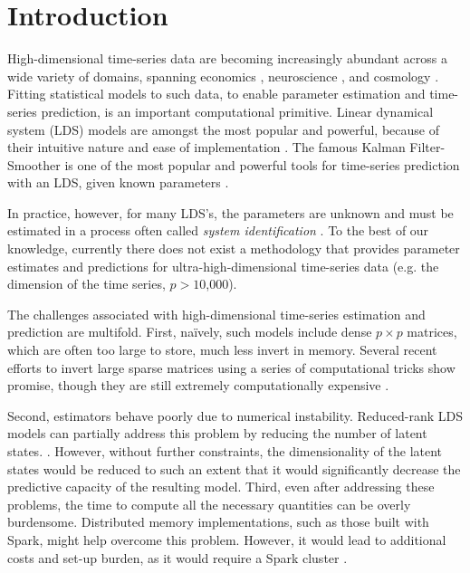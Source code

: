 \documentclass[times,twocolumn,final,authoryear]{elsarticle}
\begin{document}

\section{Introduction}
High-dimensional  time-series data are becoming increasingly  abundant across a wide variety of domains, spanning economics \citep{Johansen1988}, neuroscience \citep{Friston2003a},   and cosmology \citep{Xie2013a}. Fitting statistical models to such data, to enable parameter estimation and time-series prediction, is an important computational primitive.
Linear dynamical system (LDS) models are amongst the most popular and powerful, because of their intuitive nature and ease of implementation \citep{Kalman1963}.   The famous Kalman Filter-Smoother is one of the most popular and powerful tools for time-series prediction with an LDS, given known parameters \citep{Kalman1960a}.

In practice, however, for many LDS's, the parameters are unknown and must be estimated in a process often called \emph{system identification} \citep{Ljung1998}.  To the best of our knowledge, currently there does not exist a methodology that provides parameter estimates and predictions for ultra-high-dimensional time-series data (e.g. the dimension of the time series, $p > 10$,$000$).

The challenges associated with high-dimensional time-series estimation and prediction are multifold.  First, na\"ively, such models include dense $p \times p$ matrices, which are often too large to store, much less invert in memory.  Several recent efforts to invert large sparse matrices using a series of computational tricks show promise, though they are still extremely computationally expensive  \citep{Hsieh2013, Banerjee2013a}.

Second, estimators behave poorly due to numerical instability.
Reduced-rank LDS models can partially address this problem by reducing the number of latent states.  \citep{CHEN1989}.  However, without further constraints, the dimensionality of the latent states would be reduced to such an extent  that it would significantly decrease the predictive capacity of the resulting model.  Third, even after addressing these problems, the time to compute all the necessary quantities can be overly burdensome. Distributed memory implementations, such as those built with Spark, might help overcome this problem. However, it would lead to additional costs and set-up burden, as it would require a Spark cluster \citep{Zaharia2010}.
\end{document}
